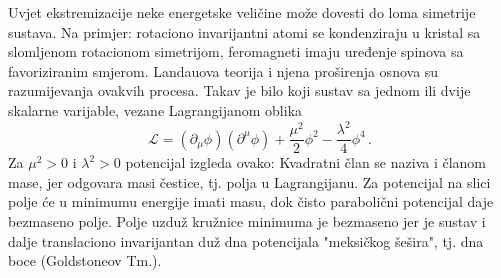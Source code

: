 \documentclass[a4paper,12pt]{report}
\begin{document}
Uvjet ekstremizacije neke energetske veličine može dovesti do loma simetrije sustava. Na primjer: rotaciono invarijantni atomi se kondenziraju u kristal sa slomljenom rotacionom simetrijom, feromagneti imaju uređenje spinova sa favoriziranim smjerom. Landauova teorija i njena proširenja osnova su razumijevanja ovakvih procesa. Takav je bilo koji sustav sa jednom ili dvije skalarne varijable, vezane Lagrangijanom oblika $$\mathcal{L}=(\partial_{\mu}\phi)(\partial^{\mu}\phi)+\frac{\mu^{2}}{2}\phi^{2}-\frac{\lambda^{2}}{4}\phi^{4}\,.$$ Za $\mu^{2}>0$ i $\lambda^{2}>0$ potencijal izgleda ovako: 
Kvadratni član se naziva i članom mase, jer odgovara masi čestice, tj. polja u Lagrangijanu. Za potencijal na slici polje će u minimumu energije imati masu, dok čisto parabolični potencijal daje bezmaseno polje. 
Polje uzduž kružnice minimuma je bezmaseno jer je sustav i dalje translaciono invarijantan duž dna potencijala "meksičkog šešira", tj. dna boce (Goldstoneov Tm.).
\end{document}
